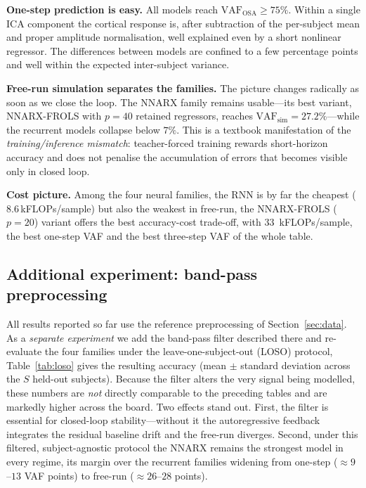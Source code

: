 \documentclass[10pt,twocolumn,letterpaper]{article}
\begin{document}
\noindent\textbf{One-step prediction is easy.} All models reach
$\mathrm{VAF_{OSA}}\geq 75\%$. Within a single ICA component the cortical
response is, after subtraction of the per-subject mean and proper
amplitude normalisation, well explained even by a short nonlinear
regressor. The differences between models are confined to a few
percentage points and well within the expected inter-subject variance.

\noindent\textbf{Free-run simulation separates the families.} The
picture changes radically as soon as we close the loop. The NNARX family
remains usable---its best variant, NNARX-FROLS with $p=40$ retained
regressors, reaches $\mathrm{VAF_{sim}}=27.2\%$---while the recurrent
models collapse below $7\%$. This is a textbook manifestation of the
\emph{training/inference mismatch}: teacher-forced training rewards
short-horizon accuracy and does not penalise the accumulation of errors
that becomes visible only in closed loop.

\noindent\textbf{Cost picture.} Among the four neural families, the RNN
is by far the cheapest ($8.6$\,kFLOPs/sample) but also the weakest in
free-run, the NNARX-FROLS ($p=20$) variant offers the best accuracy-cost
trade-off, with $33$~kFLOPs/sample, the best one-step VAF and the best
three-step VAF of the whole table.

\subsection{Additional experiment: band-pass preprocessing}\label{sec:loso}

All results reported so far use the reference preprocessing of
Section~\ref{sec:data}. As a \emph{separate experiment} we add the
band-pass filter described there and re-evaluate the four families under
the leave-one-subject-out (LOSO) protocol, Table~\ref{tab:loso} gives the
resulting accuracy (mean $\pm$ standard deviation across the $S$ held-out
subjects). Because the filter alters the very signal being modelled, these
numbers are \emph{not} directly comparable to the preceding tables and are
markedly higher across the board. Two effects stand out. First, the filter
is essential for closed-loop stability---without it the autoregressive
feedback integrates the residual baseline drift and the free-run diverges.
Second, under this filtered, subject-agnostic protocol the NNARX remains
the strongest model in every regime, its margin over the recurrent
families widening from one-step ($\approx 9$--$13$ VAF points) to free-run
($\approx 26$--$28$ points).
\end{document}
